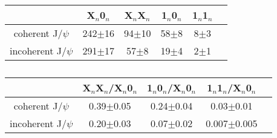 \DIFdelend \begin{table}[h]
      \begin{center}
      \DIFdelbeginFL %
{%
}
\DIFdelendFL \begin{tabular}{|c|c|c|c|c|c|}
        \hline
         &  X$_{n}$0$_{n}$& X$_{n}$X$_{n}$ & 1$_{n}$0$_{n}$ & 1$_{n}$1$_{n}$  \\ \hline
        coherent J/$\psi$ &  242$\pm$16&94$\pm$10&58$\pm$8&8$\pm$3\\ \hline
        incoherent J/$\psi$ & 291$\pm$17&57$\pm$8&19$\pm$4&2$\pm$1\\ \hline
      \end{tabular}
      \DIFaddbeginFL \caption{\label{tab:r1} }
      \DIFaddendFL \end{center}
    \DIFdelbeginFL %

\DIFdelendFL \end{table}

    \begin{table}[h]
      \begin{center}
        \DIFdelbeginFL %
{%
}
\DIFdelendFL \begin{tabular}{|c|c|c|c|c|}
          \hline
          & X$_{n}$X$_{n}$/X$_{n}$0$_{n}$ & 1$_{n}$0$_{n}$/X$_{n}$0$_{n}$ & 1$_{n}$1$_{n}$/X$_{n}$0$_{n}$  \\ \hline
          coherent J/$\psi$ &  0.39$\pm$0.05&0.24$\pm$0.04&0.03$\pm$0.01\\ \hline
          incoherent J/$\psi$ &  0.20$\pm$0.03&0.07$\pm$0.02&0.007$\pm$0.005 \\ \hline
        \end{tabular}
      \DIFaddbeginFL \caption{\label{tab:r2} }
      \DIFaddendFL \end{center}
    \end{table}

